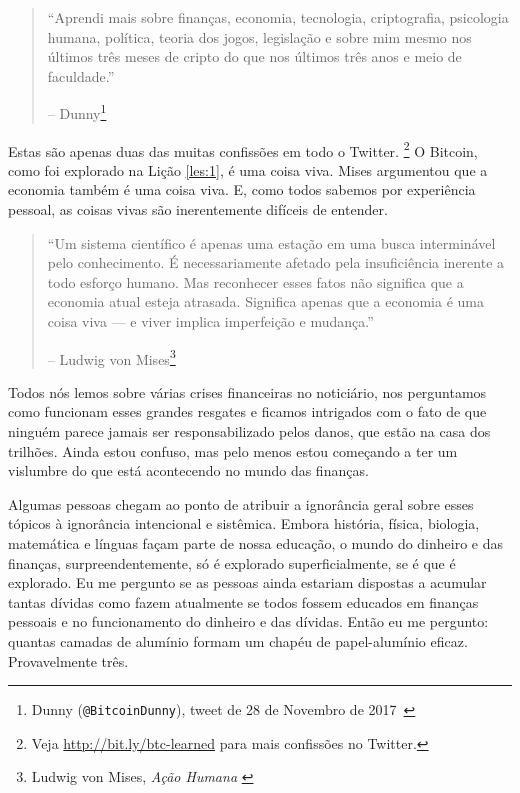 \begin{quotation}\begin{samepage}
\enquote{Aprendi mais sobre finanças, economia, tecnologia, criptografia, psicologia humana, política, teoria dos jogos, legislação e sobre mim mesmo nos últimos três meses de cripto do que nos últimos três anos e meio de faculdade.}
\begin{flushright} -- Dunny\footnote{Dunny (\texttt{@BitcoinDunny}), tweet de 28 de Novembro de 2017~\cite{bitcoindunny-tweet}}
\end{flushright}\end{samepage}\end{quotation}

Estas são apenas duas das muitas confissões em todo o Twitter. \footnote{Veja \url{http://bit.ly/btc-learned} para mais confissões no Twitter.} O Bitcoin, como foi explorado na Lição \ref{les:1}, é uma coisa viva. Mises argumentou que a economia também é uma coisa viva. E, como todos sabemos por experiência pessoal, as coisas vivas são inerentemente difíceis de entender.

\begin{quotation}\begin{samepage}
\enquote{Um sistema científico é apenas uma estação em uma busca interminável pelo conhecimento. É necessariamente afetado pela insuficiência inerente a todo esforço humano. Mas reconhecer esses fatos não significa que a economia atual esteja atrasada. Significa apenas que a economia é uma coisa viva --- e viver implica imperfeição e mudança.}
\begin{flushright} -- Ludwig von Mises\footnote{Ludwig von Mises, \textit{Ação Humana}
\cite{human-action}}
\end{flushright}\end{samepage}\end{quotation}

Todos nós lemos sobre várias crises financeiras no noticiário, nos perguntamos como funcionam esses grandes resgates e ficamos intrigados com o fato de que ninguém parece jamais ser responsabilizado pelos danos, que estão na casa dos trilhões. Ainda estou confuso, mas pelo menos estou começando a ter um vislumbre do que está acontecendo no mundo das finanças.

Algumas pessoas chegam ao ponto de atribuir a ignorância geral sobre esses tópicos à ignorância intencional e sistêmica. Embora história, física, biologia, matemática e línguas façam parte de nossa educação, o mundo do dinheiro e das finanças, surpreendentemente, só é explorado superficialmente, se é que é explorado. Eu me pergunto se as pessoas ainda estariam dispostas a acumular tantas dívidas como fazem atualmente se todos fossem educados em finanças pessoais e no funcionamento do dinheiro e das dívidas. Então eu me pergunto: quantas camadas de alumínio formam um chapéu de papel-alumínio eficaz. Provavelmente três.


